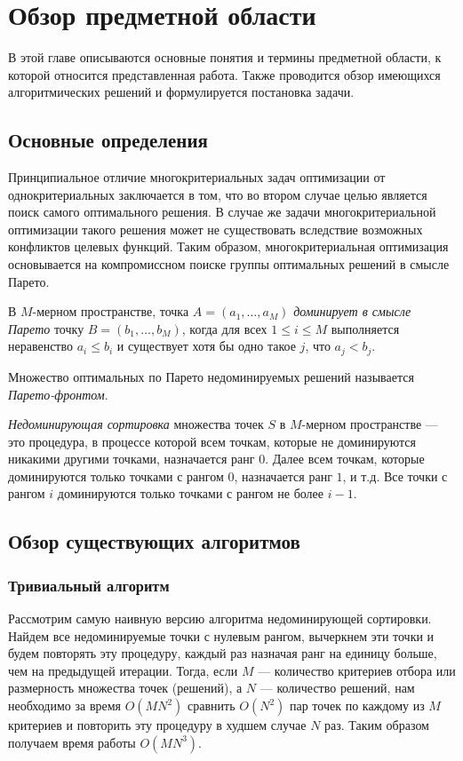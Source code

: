 \chapter{Обзор предметной области}
В этой главе описываются основные понятия и термины предметной области, к которой относится представленная работа. Также проводится обзор имеющихся алгоритмических решений и формулируется постановка задачи.

\section{Основные определения}

Принципиальное отличие многокритериальных задач оптимизации от однокритериальных заключается в том, что во втором случае целью является поиск самого оптимального решения. В случае же задачи многокритериальной оптимизации такого решения может не существовать вследствие возможных конфликтов целевых функций. Таким образом, многокритериальная оптимизация основывается на компромиссном поиске группы оптимальных решений в смысле Парето.
\begin{definition}
    В $M$-мерном пространстве, точка $A = (a_1, \ldots, a_M)$ \textit{доминирует в смысле Парето} точку $B = (b_1, \ldots, b_M)$, когда для всех $1 \leq i \leq M$ выполняется неравенство $a_i \leq b_i$ и существует хотя бы одно такое $j$, что $a_j < b_j$.
\end{definition}
\begin{definition}
    Множество оптимальных по Парето недоминируемых решений называется \textit{Парето-фронтом}.
\end{definition}
\begin{definition}
    \textit{Недоминирующая сортировка} множества точек $S$ в $M$-мерном пространстве --- это процедура, в процессе которой всем точкам, которые не доминируются никакими другими точками, назначается ранг $0$. Далее всем точкам, которые доминируются только точками с рангом $0$, назначается ранг $1$, и т.д. Все точки с рангом $i$ доминируются только точками с рангом не более $i - 1$.
\end{definition}

\section{Обзор существующих алгоритмов}
\subsection{Тривиальный алгоритм}
Рассмотрим самую наивную версию алгоритма недоминирующей сортировки. Найдем все недоминируемые точки с нулевым рангом, вычеркнем эти точки и будем повторять эту процедуру, каждый раз назначая ранг на единицу больше, чем на предыдущей итерации. Тогда, если $M$ --- количество критериев отбора или размерность множества точек (решений), а $N$ --- количество решений, нам необходимо за время $O(MN^2)$ сравнить $O(N^2)$ пар точек по каждому из $M$ критериев и повторить эту процедуру в худшем случае $N$ раз. Таким образом получаем время работы $O(MN^3)$.

